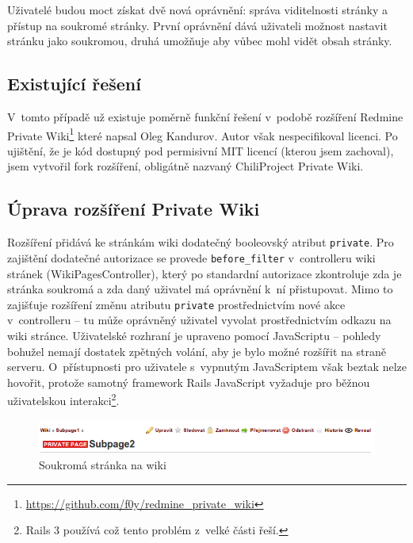 \documentclass[thesis=B,czech]{FITthesis}[2012/05/02]
\begin{document}
Uživatelé budou moct získat dvě nová oprávnění: správa viditelnosti
stránky a přístup na soukromé stránky. První oprávnění dává uživateli
možnost nastavit stránku jako soukromou, druhá umožňuje aby vůbec mohl
vidět obsah stránky.

\subsection{Existující řešení}

V~tomto případě už existuje poměrně funkční řešení v~podobě rozšíření
Redmine Private Wiki\footnote{\url{https://github.com/f0y/redmine_private_wiki}}
které napsal Oleg Kandurov. Autor však nespecifikoval licenci. Po
ujištění, že je kód dostupný pod permisivní MIT licencí (kterou jsem
zachoval), jsem vytvořil \gls{fork} rozšíření, obligátně nazvaný
ChiliProject Private Wiki.

\subsection{Úprava rozšíření Private Wiki}

Rozšíření přidává ke stránkám wiki dodatečný booleovský atribut
\lstinline!private!. Pro zajištění dodatečné autorizace se provede
\lstinline!before_filter! v~controlleru wiki stránek
(WikiPagesController), který po standardní autorizace zkontroluje zda je
stránka soukromá a zda daný uživatel má oprávnění k~ní přistupovat. Mimo
to zajišťuje rozšíření změnu atributu \lstinline!private!
prostřednictvím nové akce v~controlleru -- tu může oprávněný uživatel
vyvolat prostřednictvím odkazu na wiki stránce. Uživatelské rozhraní je
upraveno pomocí JavaScriptu -- pohledy bohužel nemají dostatek zpětných
volání, aby je bylo možné rozšířit na straně serveru. O~přístupnosti pro
uživatele s~vypnutým JavaScriptem však beztak nelze hovořit, protože
samotný framework Rails JavaScript vyžaduje pro běžnou uživatelskou
interakci\footnote{Rails 3 používá 
  což tento problém z~velké části řeší.}.

\begin{figure}[tbp]
\centering
\centerline{\includegraphics[width=1.2\textwidth]{wiki-gui1.png}}
\caption{Soukromá stránka na wiki}
\label{fig:GUIPrivateWiki}
\end{figure}
\end{document}
